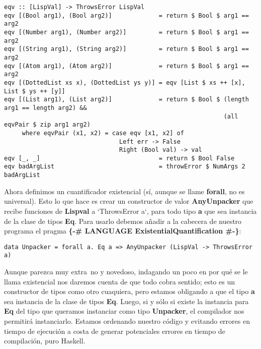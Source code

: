\begin{minipage}{\linewidth}
\begin{tiny}
\begin{lstlisting}[frame=single]
eqv :: [LispVal] -> ThrowsError LispVal
eqv [(Bool arg1), (Bool arg2)]             = return $ Bool $ arg1 == arg2
eqv [(Number arg1), (Number arg2)]         = return $ Bool $ arg1 == arg2
eqv [(String arg1), (String arg2)]         = return $ Bool $ arg1 == arg2
eqv [(Atom arg1), (Atom arg2)]             = return $ Bool $ arg1 == arg2
eqv [(DottedList xs x), (DottedList ys y)] = eqv [List $ xs ++ [x], List $ ys ++ [y]]
eqv [(List arg1), (List arg2)]             = return $ Bool $ (length arg1 == length arg2) && 
                                                             (all eqvPair $ zip arg1 arg2)
     where eqvPair (x1, x2) = case eqv [x1, x2] of
                                Left err -> False
                                Right (Bool val) -> val
eqv [_, _]                                 = return $ Bool False
eqv badArgList                             = throwError $ NumArgs 2 badArgList
\end{lstlisting}
\end{tiny}
\end{minipage}

Ahora definimos un cuantificador existencial (s\'i, aunque se llame \textbf{forall}, no es universal). Esto lo que hace es crear un constructor de valor \textbf{AnyUnpacker} que recibe funciones de \textbf{Lispval} a `ThrowsError a`, para todo tipo \textbf{a} que sea instancia de la clase de tipos \textbf{Eq}. Para usarlo debemos a\~nadir a la cabecera de nuestro programa el pragma \textbf{\{-\# LANGUAGE ExistentialQuantification \#-\}}:\\

\begin{minipage}{\linewidth}
\begin{footnotesize}
\begin{lstlisting}[frame=single]
data Unpacker = forall a. Eq a => AnyUnpacker (LispVal -> ThrowsError a)
\end{lstlisting}
\end{footnotesize}
\end{minipage}

Aunque parezca muy extra~no y novedoso, indagando un poco en por qu\'e se le llama existencial nos daremos cuenta de que todo cobra sentido; esto es un constructor de tipos como otro cuaquiera, pero estamos obligando a que el tipo \textbf{a} sea instancia de la clase de tipos \textbf{Eq}. Luego, si y s\'olo si existe la instancia para \textbf{Eq} del tipo que queramos instanciar como tipo \textbf{Unpacker}, el compilador nos permitir\'a instanciarlo. Estamos ordenando nuestro c\'odigo y evitando errores en tiempo de ejecuci\'on a costa de generar potenciales errores en tiempo de compilaci\'on, puro Haskell.\\

